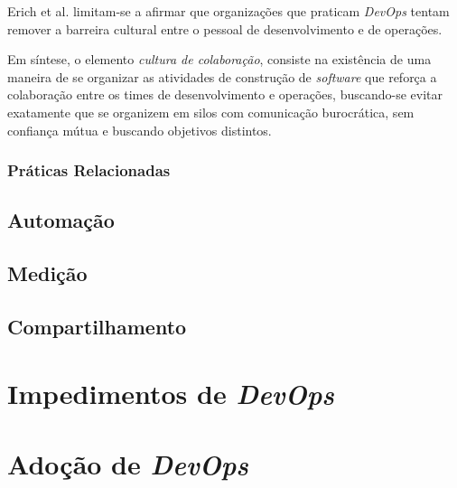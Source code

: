 Erich et al. \cite{qualitative_devops_journalsw_17} limitam-se a afirmar que
organizações que praticam \textit{DevOps} tentam remover a barreira cultural
entre o pessoal de desenvolvimento e de operações.

Em síntese, o elemento \emph{cultura de colaboração}, consiste na existência de
 uma maneira de se organizar as atividades de construção
de \textit{software} que reforça a colaboração entre os times de desenvolvimento
e operações, buscando-se evitar exatamente que se organizem em silos com
comunicação burocrática, sem confiança mútua e buscando objetivos distintos.

\subsubsection{Práticas Relacionadas}

\subsection{Automação}

\subsection{Medição}

\subsection{Compartilhamento}

\section{Impedimentos de \textit{DevOps}}

\section{Adoção de \textit{DevOps}}
